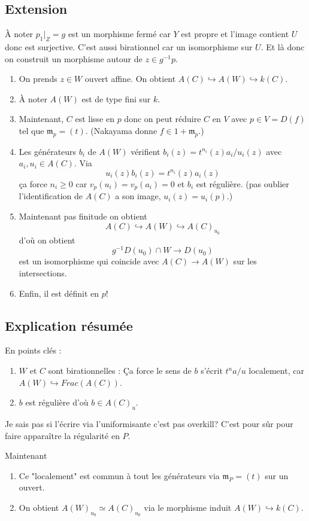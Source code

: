 \documentclass[a4paper,12pt]{book}
\newcommand{\m}{\mathfrak{m}}
\theoremstyle{plain}
\theoremstyle{definition}
\theoremstyle{remark}
\begin{document}
\subsection{Extension}
À noter $p_1|_Z=g$ est un morphisme fermé car $Y$ est propre et
l'image contient $U$ donc est surjective. C'est aussi 
birationnel car un isomorphisme sur $U$. Et là donc on
construit un morphisme autour de $z\in g^{-1} p$.  
\begin{enumerate}
  \item On prends $z\in W$ ouvert affine. On obtient
    $A(C)\hookrightarrow A(W)\hookrightarrow k(C)$.
  \item À noter $A(W)$ est de type fini sur $k$. 
  \item Maintenant, $C$ est lisse en $p$ donc on peut réduire
  $C$ en $V$ avec $p\in V=D(f)$ tel que $\m_p=(t)$. (Nakayama
  donne $f\in 1+\m_p$.)
  \item Les générateurs $b_i$ de $A(W)$ vérifient 
    $b_i(z)=t^{n_i}(z)a_i/u_i(z)$ avec $a_i,u_i\in A(C)$.
    Via 
    \[u_i(z)b_i(z)=t^{n_i}(z)a_i(z)\]
    ça force $n_i\geq 0$ car $v_p(u_i)=v_p(a_i)=0$
    et $b_i$ est régulière.
    (pas oublier l'identification de $A(C)$ a son 
    image, $u_i(z)=u_i(p)$.)
  \item Maintenant pas finitude on obtient
    \[A(C)\hookrightarrow A(W)\hookrightarrow A(C)_{u_0}\]
    d'où on obtient \[g^{-1}D(u_0)\cap W\to D(u_0)\]
    est un isomorphisme qui coincide avec $A(C)\to A(W)$
    sur les intersections.
  \item Enfin, il est définit en $p$!
\end{enumerate}

\subsection{Explication résumée}
En points clés :
\begin{enumerate}
  \item $W$ et $C$ sont birationnelles : Ça force le sens de 
    $b$ s'écrit $t^n a/u$ localement, car $A(W)\hookrightarrow
    Frac(A(C))$.
  \item $b$ est régulière d'où $b\in A(C)_{u}$.
\end{enumerate}
Je sais pas si l'écrire via l'uniformisante c'est pas overkill?
C'est pour sûr pour faire apparaître la régularité en $P$.

Maintenant 
\begin{enumerate}
  \item Ce "localement" est commun à tout les générateurs via
    $\m_P=(t)$ sur un ouvert.
  \item On obtient $A(W)_{u_0}\simeq A(C)_{u_0}$ via le 
    morphisme induit $A(W)\hookrightarrow k(C)$.
\end{enumerate}
\end{document}
